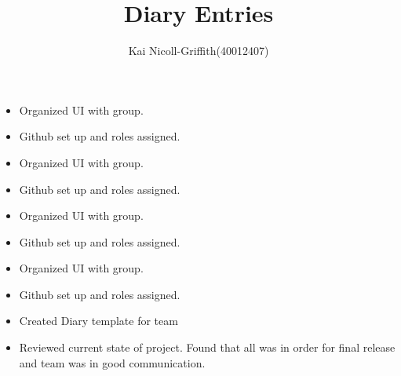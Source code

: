 \documentclass{article}
\title{Diary Entries}
\author{Kai Nicoll-Griffith(40012407)}
\begin{document}
	\maketitle
	
	\begin{itemize}
		\item Organized UI with group.  
		\item Github set up and roles assigned.
	\end{itemize}

	\begin{itemize}
		\item Organized UI with group.  
		\item Github set up and roles assigned.
	\end{itemize}

	\begin{itemize}
		\item Organized UI with group.  
		\item Github set up and roles assigned.
	\end{itemize}

	\begin{itemize}
		\item Organized UI with group.  
		\item Github set up and roles assigned.
	\end{itemize}
	\begin{itemize}
		\item Created Diary template for team
	\end{itemize}
	\begin{itemize}
		\item Reviewed current state of project. Found that all was in order for final release and team was in good communication. 
	\end{itemize}
\end{document}
